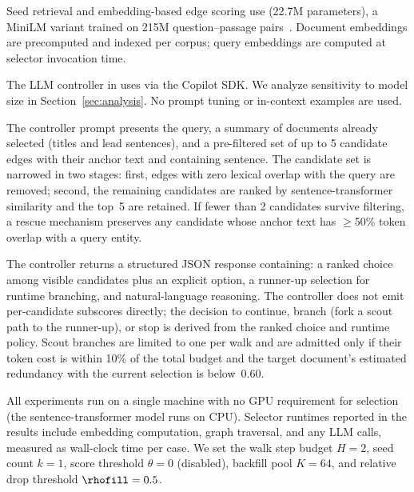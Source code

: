 Seed retrieval and embedding-based edge scoring use
\stmodel (22.7M parameters), a MiniLM variant
trained on 215M question--passage pairs~\cite{reimers2019sentencebert}.
Document embeddings are precomputed and indexed per corpus; query embeddings
are computed at selector invocation time.

The LLM controller in \selcontroller uses \controllerlm via the
Copilot SDK.
We analyze sensitivity to model size in Section~\ref{sec:analysis}.
No prompt tuning or in-context examples are used.

The controller prompt presents the query, a summary of documents already selected (titles and lead sentences), and a pre-filtered set of up to 5 candidate edges with their anchor text and containing sentence. The candidate set is narrowed in two stages: first, edges with zero lexical overlap with the query are removed; second, the remaining candidates are ranked by sentence-transformer similarity and the top~5 are retained. If fewer than 2 candidates survive filtering, a rescue mechanism preserves any candidate whose anchor text has $\geq$50\% token overlap with a query entity.

The controller returns a structured JSON response containing: a ranked choice among visible candidates plus an explicit \actstop{} option, a runner-up selection for runtime branching, and natural-language reasoning. The controller does not emit per-candidate subscores directly; the decision to continue, branch (fork a scout path to the runner-up), or stop is derived from the ranked choice and runtime policy. Scout branches are limited to one per walk and are admitted only if their token cost is within 10\% of the total budget and the target document's estimated redundancy with the current selection is below~0.60.

All experiments run on a single machine with no GPU requirement for
selection (the sentence-transformer model runs on CPU).
Selector runtimes reported in the results include embedding computation,
graph traversal, and any LLM calls, measured as wall-clock time per case.
We set the walk step budget $H=2$, seed count $k=1$, score threshold $\theta=0$ (disabled), backfill pool $K=64$, and relative drop threshold $\rhofill=0.5$.
